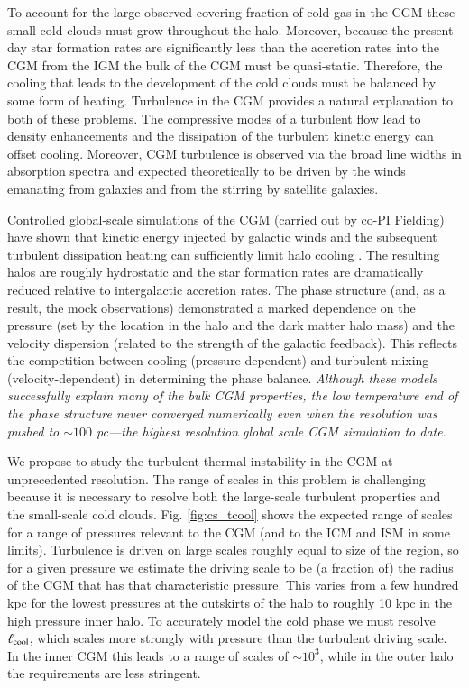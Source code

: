 \documentclass[11pt,letterpaper,english]{article}
\begin{document}
To account for the large observed covering fraction of cold gas in the CGM these small cold clouds must grow throughout the halo. Moreover, because the present day star formation rates are significantly less than the accretion rates into the CGM from the IGM the bulk of the CGM must be quasi-static. Therefore, the cooling that leads to the development of the cold clouds must be balanced by some form of heating. Turbulence in the CGM provides a natural explanation to both of these problems. The compressive modes of a turbulent flow lead to density enhancements and the dissipation of the turbulent kinetic energy can offset cooling. Moreover, CGM turbulence is observed via the broad line widths in  absorption spectra and expected theoretically to be driven by the winds emanating from galaxies and from the stirring by satellite galaxies. 

Controlled global-scale simulations of the CGM (carried out by co-PI Fielding) have shown that kinetic energy injected by galactic winds and the subsequent turbulent dissipation heating can sufficiently limit halo cooling \cite{Fielding17}. 
The resulting halos are roughly hydrostatic and the star formation rates are dramatically reduced relative to intergalactic accretion rates. 
The phase structure (and, as a result, the mock observations) demonstrated a marked dependence on the pressure (set by the location in the halo and the dark matter halo mass) and the velocity dispersion (related to the strength of the galactic feedback). 
This reflects the competition between cooling (pressure-dependent) and turbulent mixing (velocity-dependent) in determining the phase balance.
{\em Although these models successfully explain many of the bulk CGM properties, the low temperature end of the phase structure never converged numerically even when the resolution was pushed to $\sim 100$ pc---the highest resolution global scale CGM simulation to date}. 

We propose to study the turbulent thermal instability in the CGM at unprecedented resolution. The range of scales in this problem is challenging because it is necessary to resolve both the large-scale turbulent properties and the small-scale cold clouds. Fig. \ref{fig:cs_tcool} shows the expected range of scales for a range of pressures relevant to the CGM (and to the ICM and ISM in some limits). Turbulence is driven on large scales roughly equal to size of the region, so for a given pressure we estimate the driving scale to be (a fraction of) the radius of the CGM that has that characteristic pressure. This varies from a few hundred kpc for the lowest pressures at the outskirts of the halo to roughly 10 kpc in the high pressure inner halo. To accurately model the cold phase we must resolve $\ell_{\rm cool}$, which scales more strongly with pressure than the turbulent driving scale. In the inner CGM this leads to a range of scales of $\sim10^3$, while in the outer halo the requirements are less stringent.
\end{document}
